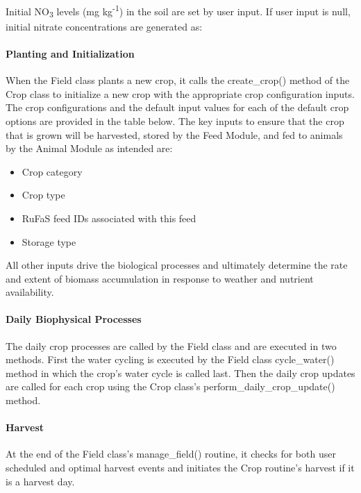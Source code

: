 Initial NO\textsubscript{3} levels (mg kg\textsuperscript{-1}) in the soil are set by user input. If user input is null, initial nitrate concentrations are generated as: 



\paragraph{Planting and Initialization}
\vspace{-0.25cm}

When the Field class plants a new crop, it calls the create\_crop() method of the Crop class to initialize a new crop with the appropriate crop configuration inputs. The crop configurations and the default input values for each of the default crop options are provided in the table below. The key inputs to ensure that the crop that is grown will be harvested, stored by the Feed Module, and fed to animals by the Animal Module as intended are:
\begin{itemize}
    \item Crop category
    \item Crop type
    \item RuFaS feed IDs associated with this feed
    \item Storage type
\end{itemize}

All other inputs drive the biological processes and ultimately determine the rate and extent of biomass accumulation in response to weather and nutrient availability.
\paragraph{Daily Biophysical Processes}
\vspace{-0.25cm}

The daily crop processes are called by the Field class and are executed in two methods. First the water cycling is executed by the Field class cycle\_water() method in which the crop’s water cycle is called last. Then the daily crop updates are called for each crop using the Crop class’s perform\_daily\_crop\_update() method.

\paragraph{Harvest}
\vspace{-0.25cm}

At the end of the Field class’s manage\_field() routine, it checks for both user scheduled and optimal harvest events and initiates the Crop routine’s harvest if it is a harvest day.

